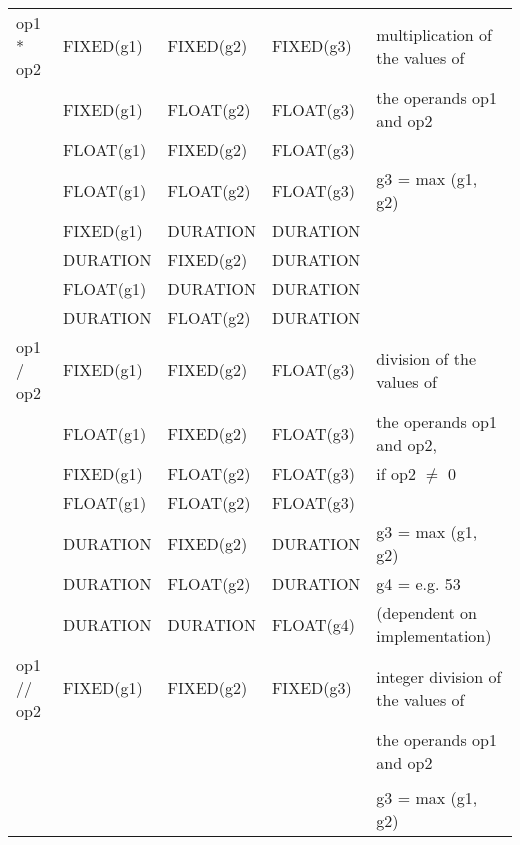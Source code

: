 \begin{table}
\begin{center}
\begin{tabular}{|l|l|l|l|l|}
op1 * op2        & FIXED(g1)       & FIXED(g2)       & FIXED(g3)         & multiplication of the values of\\
                 & FIXED(g1)       & FLOAT(g2)       & FLOAT(g3)         & the operands op1 and op2\\
                 & FLOAT(g1)       & FIXED(g2)       & FLOAT(g3)         & \\
                 & FLOAT(g1)       & FLOAT(g2)       & FLOAT(g3)         & g3 = max (g1, g2)\\
                 & FIXED(g1)       & DURATION        & DURATION          & \\
                 & DURATION        & FIXED(g2)       & DURATION          & \\
                 & FLOAT(g1)       & DURATION        & DURATION          & \\
                 & DURATION        & FLOAT(g2)       & DURATION          & \\ \hline

op1 / op2        & FIXED(g1)       & FIXED(g2)       & FLOAT(g3)         & division of the values of\\
                 & FLOAT(g1)       & FIXED(g2)       & FLOAT(g3)         & the operands op1 and op2,\\
                 & FIXED(g1)       & FLOAT(g2)       & FLOAT(g3)         & if op2 $\neq$ 0\\
                 & FLOAT(g1)       & FLOAT(g2)       & FLOAT(g3)         & \\
                 & DURATION        & FIXED(g2)       & DURATION          & g3 = max (g1, g2)\\
                 & DURATION        & FLOAT(g2)       & DURATION          & g4 = e.g. 53\\
                 & DURATION        & DURATION        & FLOAT(g4)         & (dependent on implementation)\\ \hline

op1 // op2       & FIXED(g1)       & FIXED(g2)       & FIXED(g3)         & integer division of the values of\\
                 &                 &                 &                   & the operands op1 and op2\\
                 &                 &                 &                   & \\
                 &                 &                 &                   & g3 = max (g1, g2)\\ \hline


\end{tabular}
\end{center}
\end{table}
